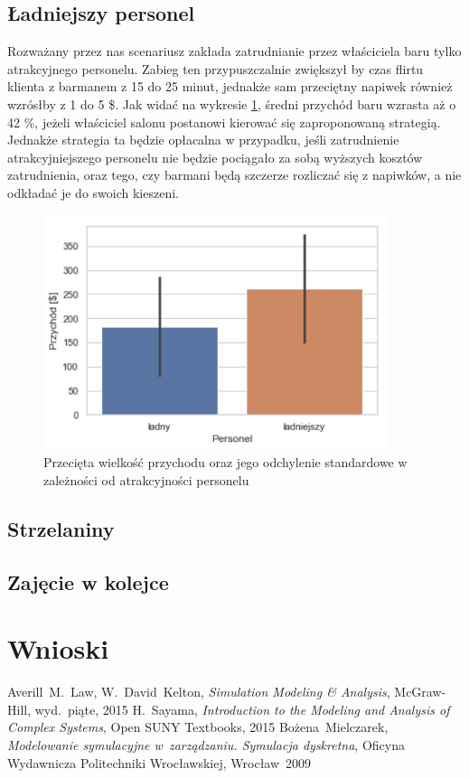 \documentclass[12pt, a4paper, oneside]{mwart} %
\begin{document}
\subsection{Ładniejszy personel}
Rozważany przez nas scenariusz zakłada zatrudnianie przez właściciela baru tylko atrakcyjnego personelu. Zabieg ten przypuszczalnie zwiększył by czas flirtu klienta z barmanem z 15 do 25 minut, jednakże sam przeciętny napiwek również wzrósłby z 1 do 5 \$. Jak widać na wykresie \ref{wyk_personel}, średni przychód baru wzrasta aż o 42 \%, jeżeli właściciel salonu postanowi kierować się zaproponowaną strategią. Jednakże strategia ta będzie opłacalna w przypadku, jeśli zatrudnienie atrakcyjniejszego personelu nie będzie pociągało za sobą wyższych kosztów zatrudnienia, oraz tego, czy barmani będą szczerze rozliczać się z napiwków, a nie odkładać je do swoich kieszeni.

\begin{figure}
\centering
\caption{Przecięta wielkość przychodu oraz jego odchylenie standardowe w zależności od atrakcyjności personelu}
\label{wyk_personel}
\includegraphics[width = 0.9\textwidth]{wykresy/personel.pdf}
\end{figure}

\subsection{Strzelaniny}

\subsection{Zajęcie w kolejce}


\section{Wnioski}

\begin{thebibliography}{9}
Averill~M.~Law, W.~David~Kelton,
\emph{Simulation Modeling \& Analysis},
McGraw-Hill, wyd.~piąte, 2015
H.~Sayama, \emph{Introduction to the Modeling and Analysis of Complex Systems},
Open SUNY Textbooks, 2015
Bożena~Mielczarek, \emph{Modelowanie symulacyjne w~zarządzaniu. Symulacja dyskretna},
Oficyna Wydawnicza Politechniki Wrocławskiej, Wrocław~2009
\end{thebibliography}
\end{document}
